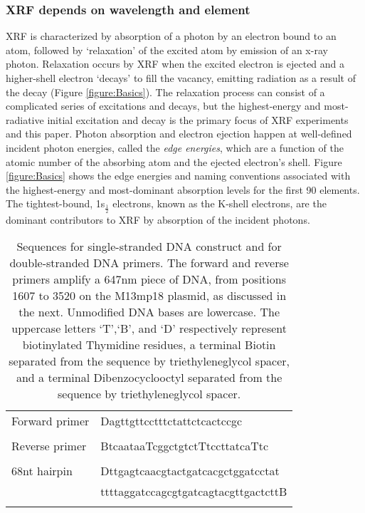 \documentclass[%
  aip,12pt,tightenlines,
  amsthm,
 amsmath,amssymb
]{article}
\newcommand{\e}[0]{\\ \hline}
\newcommand{\fRef}[1]{Figure \ref{figure:#1}}
\newcommand{\tLabel}[1]{\label{table:#1}}
\newcommand{\sLabel}[1]{\label{section:#1}}
\newcommand{\pcaption}[1]{\caption{\noindent#1}}
\newcommand{\firstp}[0]{}
\begin{document}
\subsubsection{\sLabel{Beer}XRF depends on wavelength and element}

\firstp XRF is characterized by absorption of a photon by an electron bound to an atom, followed by `relaxation' of the excited atom by emission of an x-ray photon.\cite{jitschin_progress_1990} Relaxation occurs by XRF when the excited electron is ejected and a higher-shell electron `decays' to fill the vacancy, emitting radiation as a result of the decay (\fRef{Basics}). The relaxation process can consist of a complicated series of excitations and decays,\cite{santra_concepts_2009} but the highest-energy and most-radiative initial excitation and decay is the primary focus of XRF experiments and this paper. Photon absorption and electron ejection happen at well-defined incident photon energies, called the \emph{edge energies}, which are a function of the atomic number of the absorbing atom and the ejected electron's shell.\cite{ueda_high-resolution_2003,de_groot_high-resolution_2001} \fRef{Basics} shows the edge energies and naming conventions associated with the highest-energy and most-dominant\cite{chantler_detailed_2000} absorption levels for the first 90 elements. The tightest-bound, 1s$_{\frac{1}{2}}$ electrons, known as the K-shell electrons, are the dominant contributors to XRF by absorption of the incident photons.\cite{chantler_detailed_2000}

\begin{table}
\begin{tabularx}{\textwidth}{ l | l  }
\hline \hline
Forward primer & Dagttgttcctttctattctcactccgc \\ \e 
Reverse primer & BtcaataaTcggctgtctTtccttatcaTtc \\ \e 
68nt hairpin & Dttgagtcaacgtactgatcacgctggatcctat\\
& ttttaggatccagcgtgatcagtacgttgactcttB \\ \e 
\end{tabularx}
\pcaption{\tLabel{Sequences}Sequences for single-stranded DNA construct and for double-stranded DNA primers. The forward and reverse primers amplify a 647nm piece of DNA, from positions 1607 to 3520 on the M13mp18 plasmid, as discussed in the next. Unmodified DNA bases are lowercase. The uppercase letters `T',`B', and `D' respectively represent biotinylated Thymidine residues, a terminal Biotin separated from the sequence by triethyleneglycol spacer, and a terminal Dibenzocyclooctyl separated from the sequence by triethyleneglycol spacer.}
\end{table}
\end{document}
